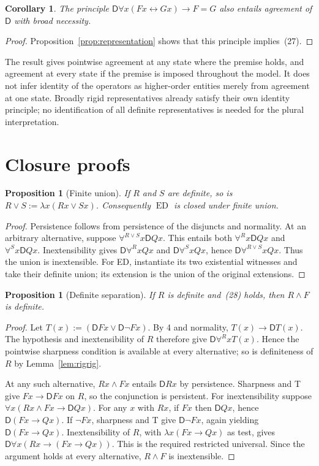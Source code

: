 \documentclass[11pt]{article}
\newtheorem{proposition}[theorem]{Proposition}
\newtheorem{corollary}[theorem]{Corollary}
\theoremstyle{definition}
\newcommand{\D}{\mathsf D}
\newcommand{\ED}{\operatorname{ED}}
\numberwithin{equation}{section}
\begin{document}
\begin{corollary}
The principle $\D \forall x(Fx\leftrightarrow Gx)\rightarrow F=G$ also entails agreement of $\D $ with broad necessity.
\end{corollary}
\begin{proof}
Proposition~\ref{prop:representation} shows that this principle implies~\textup{(27)}.
\end{proof}

The result gives pointwise agreement at any state where the premise holds, and agreement at every state if the premise is imposed throughout the model. It does not infer identity of the operators as higher-order entities merely from agreement at one state. Broadly rigid representatives already satisfy their own identity principle; no identification of all definite representatives is needed for the plural interpretation.


\section{Closure proofs}\label{app:closure}

\begin{proposition}[Finite union]\label{prop:union}
If $R$ and $S$ are definite, so is $R\vee S:=\lambda x(Rx\vee Sx)$. Consequently $\ED$ is closed under finite union.
\end{proposition}
\begin{proof}
Persistence follows from persistence of the disjuncts and normality. At an arbitrary alternative, suppose $\forall^{R\vee S}x\D Qx$. This entails both $\forall^Rx\D Qx$ and $\forall^Sx\D Qx$. Inextensibility gives $\D\forall^RxQx$ and $\D\forall^SxQx$, hence $\D\forall^{R\vee S}xQx$. Thus the union is inextensible. For ED, instantiate its two existential witnesses and take their definite union; its extension is the union of the original extensions.
\end{proof}

\begin{proposition}[Definite separation]\label{prop:sharpsep}
If $R$ is definite and~\textup{(28)} holds, then $R\wedge F$ is definite.
\end{proposition}
\begin{proof}
Let $T(x):=(\D Fx\vee\D\neg Fx)$. By 4 and normality, $T(x)\rightarrow\D T(x)$. The hypothesis and inextensibility of $R$ therefore give $\D\forall^R xT(x)$. Hence the pointwise sharpness condition is available at every alternative; so is definiteness of $R$ by Lemma~\ref{lem:rigrig}.

At any such alternative, $Rx\wedge Fx$ entails $\D Rx$ by persistence. Sharpness and T give $Fx\rightarrow\D Fx$ on $R$, so the conjunction is persistent. For inextensibility suppose $\forall x(Rx\wedge Fx\rightarrow\D Qx)$. For any $x$ with $Rx$, if $Fx$ then $\D Qx$, hence $\D(Fx\rightarrow Qx)$. If $\neg Fx$, sharpness and T give $\D\neg Fx$, again yielding $\D(Fx\rightarrow Qx)$. Inextensibility of $R$, with $\lambda x(Fx\rightarrow Qx)$ as test, gives $\D\forall x(Rx\rightarrow(Fx\rightarrow Qx))$. This is the required restricted universal. Since the argument holds at every alternative, $R\wedge F$ is inextensible.
\end{proof}
\end{document}
